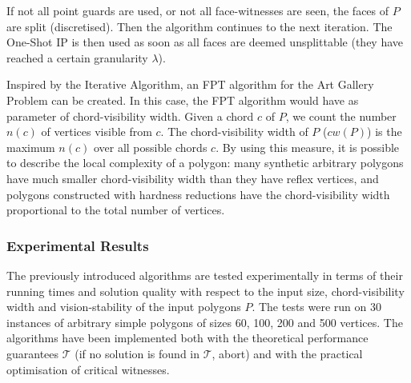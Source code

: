 If not all point guards are used, or not all face-witnesses are seen, the faces of $P$ are split (discretised). Then the algorithm continues to the next iteration. The One-Shot IP is then used as soon as all faces are deemed unsplittable (they have reached a certain granularity $\lambda$). 



Inspired by the Iterative Algorithm, an FPT algorithm for the Art Gallery Problem can be created. In this case, the FPT algorithm would have as parameter of chord-visibility width. Given a chord $c$ of $P$, we count the number $n(c)$ of vertices visible from $c$. The chord-visibility width of $P$ ($cw(P)$)  is the maximum $n(c)$ over all possible chords $c$. By using this measure, it is possible to describe the local complexity of a polygon: many synthetic arbitrary polygons have much smaller chord-visibility width than they have reflex vertices, and polygons constructed with hardness reductions have the chord-visibility width proportional to the total number of vertices. 

\subsubsection{Experimental Results}
The previously introduced algorithms are tested experimentally in terms of their running times and solution quality with respect to the input size, chord-visibility width and vision-stability of the input polygons $P$. The tests were run on 30 instances of arbitrary simple polygons of sizes 60, 100, 200 and 500 vertices. The algorithms have been implemented both with the theoretical performance guarantees $\mathcal T$ (if no solution is found in $\mathcal T$, abort) and with the practical optimisation of critical witnesses.

